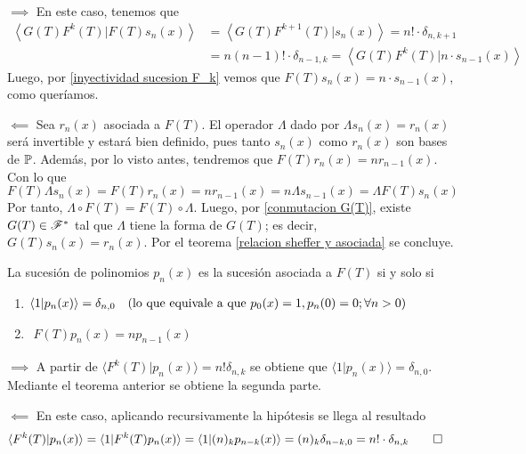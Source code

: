 \begin{demo}
    $\boxed{\implies}$ En este caso, tenemos que
    \begin{align*}
        \left\langle G(T)F^k(T) | F(T)s_n(x) \right\rangle & = \left\langle G(T)F^{k+1}(T) | s_n(x) \right\rangle = n! \cdot \delta_{n, k+1}\\
        & = n(n-1)! \cdot \delta_{n-1, k} = \left\langle G(T)F^k(T) |n \cdot s_{n-1}(x) \right\rangle
    \end{align*}
    Luego, por \ref{inyectividad sucesion F_k} vemos que $F(T)s_{n}(x) = n \cdot s_{n-1}(x)$, como queríamos. 

    $\boxed{\impliedby}$ Sea $r_n(x)$ asociada a $F(T)$. El operador $\Lambda$ dado por $\Lambda s_n(x) = r_n(x)$
    será invertible y estará bien definido, pues tanto $s_n(x)$ como $r_n(x)$ son bases de $\mathbb{P}$. Además, por lo visto antes, tendremos que $F(T)r_n(x) = n r_{n-1}(x)$. Con lo que
    \begin{equation*}
        F(T) \Lambda s_n(x) = F(T) r_n(x) = n r_{n-1}(x) = n \Lambda s_{n-1}(x) = \Lambda F(T) s_n(x)
    \end{equation*}
    Por tanto, $\Lambda \circ F(T) = F(T) \circ \Lambda$. Luego, por \ref{conmutacion G(T)}, existe $G(T) \in \mathscr{F}^*$ tal que $\Lambda$ tiene la forma de $G(T)$; es decir, $G(T)s_n(x) = r_n(x)$. Por el teorema \ref{relacion sheffer y asociada} se concluye. 
\end{demo}

\begin{corolario}\label{sucesion asociada caracterizacion operador}
    La sucesión de polinomios $p_n(x)$ es la sucesión asociada a $F(T)$ si y solo si
    \begin{enumerate}
        \item $\begin{aligned}
            \langle 1 | p_n(x) \rangle = \delta_{n,0} \quad (\textnormal{lo que equivale a que } p_0(x)=1, p_n(0)=0; \forall n > 0)
        \end{aligned}$
        \item $\begin{aligned}
            F(T)p_n(x) = np_{n-1}(x)
        \end{aligned}$
    \end{enumerate}
\end{corolario}

\begin{demo}
    $\boxed{\implies}$ A partir de $\langle F^k(T)| p_n(x)\rangle = n! \delta_{n,k}$ se obtiene que $\langle 1 | p_n(x) \rangle = \delta_{n,0}$. Mediante el teorema anterior se obtiene la segunda parte.

    $\boxed{\impliedby}$ En este caso, aplicando recursivamente la hipótesis se llega al resultado
    \begin{align*}
        \langle F^k(T) | p_n(x) \rangle & = \langle 1 | F^k(T)p_n(x) \rangle = \langle 1 | (n)_k p_{n-k}(x) \rangle = (n)_k \delta_{n-k,0} = n! \cdot \delta_{n,k} \qedhere
    \end{align*}
\end{demo}

